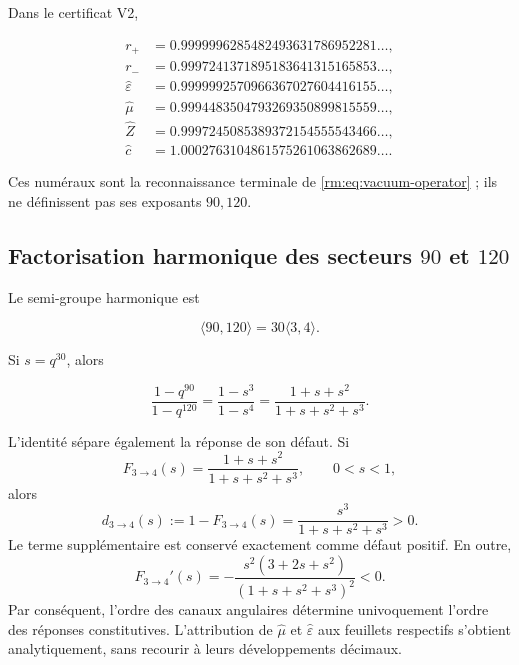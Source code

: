 Dans le certificat V2,

\begin{align*}
r_+&=0.9999996285482493631786952281\ldots,\\
r_-&=0.9997241371895183641315165853\ldots,\\
\widehat\varepsilon&=0.9999992570966367027604416155\ldots,\\
\widehat\mu&=0.9994483504793269350899815559\ldots,\\
\widehat Z&=0.9997245085389372154555543466\ldots,\\
\widehat c&=1.0002763104861575261063862689\ldots.
\end{align*}

Ces numéraux sont la reconnaissance terminale de \cref{rm:eq:vacuum-operator} ; ils ne définissent pas ses exposants \(90,120\).

\subsection{Factorisation harmonique des secteurs \texorpdfstring{\(90\)}{90} et \texorpdfstring{\(120\)}{120}}

Le semi-groupe harmonique est

\[
\langle90,120\rangle=30\langle3,4\rangle.
\]

Si \(s=q^{30}\), alors

\begin{equation}
\frac{1-q^{90}}{1-q^{120}}
=\frac{1-s^3}{1-s^4}
=\frac{1+s+s^2}{1+s+s^2+s^3}.
\label{rm:eq:three-four-completion}
\end{equation}

L'identité sépare également la réponse de son défaut. Si
\[
F_{3\to4}(s)=\frac{1+s+s^2}{1+s+s^2+s^3},
\qquad 0<s<1,
\]
alors
\begin{equation}
d_{3\to4}(s):=1-F_{3\to4}(s)
=\frac{s^3}{1+s+s^2+s^3}>0.
\label{rm:eq:vacuum-defect34}
\end{equation}
Le terme supplémentaire est conservé exactement comme défaut
positif. En outre,
\begin{equation}
F_{3\to4}'(s)
=-\frac{s^2(3+2s+s^2)}{(1+s+s^2+s^3)^2}<0.
\label{rm:eq:vacuum-monotonic34}
\end{equation}
Par conséquent, l'ordre des canaux angulaires détermine univoquement
l'ordre des réponses constitutives. L'attribution de
\(\widehat\mu\) et \(\widehat\varepsilon\) aux feuillets respectifs s'obtient
analytiquement, sans recourir à leurs développements décimaux.

